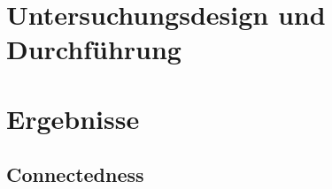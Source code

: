 
\section{Untersuchungsdesign und Durchführung} %
\label{sec:m_untersuchungsdesign}


\section{Ergebnisse} %
\label{sec:m_ergebnisse}


\subsection{Connectedness} %
\label{sub:connectedness}


